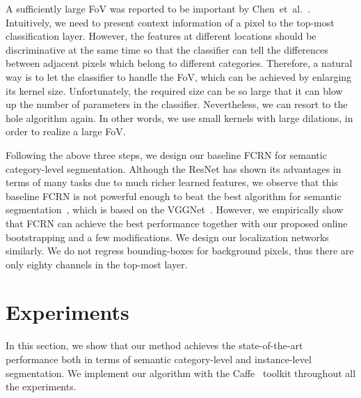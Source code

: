 \documentclass{article}
\begin{document}
A sufficiently large FoV was reported to be important by Chen~et~al.~\cite{DeepLab.ICLR.2015.Chen}.
Intuitively, we need to present context information of a pixel to the top-most classification layer.
However, the features at different locations should be discriminative at the same time
so that the classifier can tell the differences between adjacent pixels which belong to different categories.
Therefore, a natural way is to let the classifier to handle the FoV,
which can be achieved by enlarging its kernel size.
Unfortunately, the required size can be so large that it can blow up the number of parameters in the classifier.
Nevertheless, we can resort to the hole algorithm again.
In other words,
we use small kernels with large dilations,
in order to realize a large FoV.



Following the above three steps, we design our baseline FCRN for semantic category-level segmentation.
Although the ResNet has shown its advantages in terms of many tasks due to much richer learned features,
we observe that this baseline FCRN is not powerful enough to beat the best algorithm for
semantic segmentation~\cite{AdelaideContext.2016.Lin},
which is based on the VGGNet~\cite{VGGNet.2014.Simonyan}.
However,
we empirically show that FCRN can achieve the best performance together with our proposed online bootstrapping and a few modifications.
We design our localization networks similarly.
We do not regress bounding-boxes for background pixels, thus there are only eighty channels in the top-most layer.







\section{Experiments}

In this section, we show that our method achieves the state-of-the-art performance both in terms of semantic
category-level and instance-level segmentation.
We implement our algorithm with the Caffe~\cite{Caffe.2014.Jia} toolkit throughout all the experiments.
\end{document}
